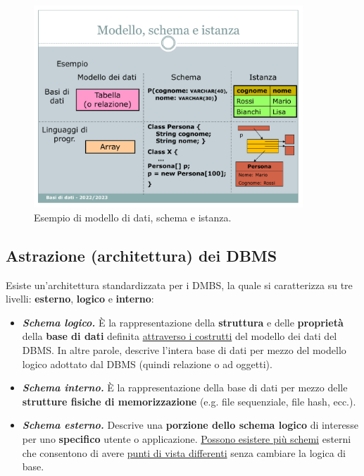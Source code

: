 \documentclass[a4paper]{article}
\begin{document}
	\begin{figure}[!htp]
		\centering
		\includegraphics[width=0.9\textwidth]{img/diff_modello-schemi-istanze.pdf}
		\caption{Esempio di modello di dati, schema e istanza.}
	\end{figure}\newpage
	
	\subsection{Astrazione (architettura) dei DBMS}\label{par: Astrazione (architettura) dei DBMS}
	
	Esiste un'architettura standardizzata per i DMBS, la quale si caratterizza su tre livelli: \textbf{esterno}, \textbf{logico} e \textbf{interno}:
	
	\begin{itemize}
		\item[\ding{80}] \textbf{\emph{Schema logico.}} È la rappresentazione della \textbf{struttura} e delle \textbf{proprietà} della \textbf{base di dati} definita \underline{attraverso i costrutti} del modello dei dati del DBMS. In altre parole, descrive l'intera base di dati per mezzo del modello logico adottato dal DBMS (quindi relazione o ad oggetti).
		
		\item[\ding{72}] \textbf{\emph{Schema interno.}} È la rappresentazione della base di dati per mezzo delle \textbf{strutture fisiche di memorizzazione} (e.g. file sequenziale, file hash, ecc.).
		
		\item[\ding{73}] \textbf{\emph{Schema esterno.}}\label{def: schema esterno} Descrive una \textbf{porzione dello schema logico} di interesse per uno \textbf{specifico} utente o applicazione. \underline{Possono esistere più schemi} esterni che consentono di avere \underline{punti di vista differenti} senza cambiare la logica di base.
	\end{itemize}
\end{document}
